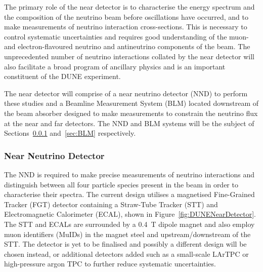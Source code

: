 The primary role of the near detector is to characterise the energy spectrum and the composition of the neutrino beam before oscillations have occurred, and to make measurements of neutrino interaction cross-sections.  This is necessary to control systematic uncertainties and requires good understanding of the muon- and electron-flavoured neutrino and antineutrino components of the beam.  The unprecedented number of neutrino interactions collated by the near detector will also facilitate a broad program of ancillary physics and is an important constituent of the DUNE experiment.

The near detector will comprise of a near neutrino detector (NND) to perform these studies and a Beamline Measurement System (BLM) located downstream of the beam absorber designed to make measurements to constrain the neutrino flux at the near and far detectors.  The NND and BLM systems will be the subject of Sections~\ref{sec:NND} and~\ref{sec:BLM} respectively.

\subsubsection{Near Neutrino Detector}\label{sec:NND}

The NND is required to make precise measurements of neutrino interactions and distinguish between all four particle species present in the beam in order to characterise their spectra.  The current design utilises a magnetised Fine-Grained Tracker (FGT) detector containing a Straw-Tube Tracker (STT) and Electromagnetic Calorimeter (ECAL), shown in Figure~\ref{fig:DUNENearDetector}.  The STT and ECALs are surrounded by a 0.4~T dipole magnet and also employ muon identifiers (MuIDs) in the magnet steel and upstream/downstream of the STT.  The detector is yet to be finalised and possibly a different design will be chosen instead, or additional detectors added such as a small-scale LArTPC or high-pressure argon TPC to further reduce systematic uncertainties.

